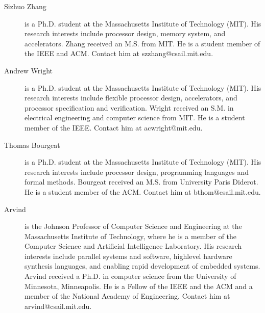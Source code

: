 \documentclass[conference]{IEEEtran}
\begin{document}
\begin{description}
    \item[Sizhuo Zhang] is a Ph.D. student at the Massachusetts Institute of Technology (MIT).
    His research interests include processor design, memory system, and accelerators.
    Zhang received an M.S. from MIT.
    He is a student member of the IEEE and ACM.
    Contact him at szzhang@csail.mit.edu.
    
    \item[Andrew Wright] is a Ph.D. student at the Massachusetts Institute of Technology (MIT).
    His research interests include flexible processor design, accelerators, and processor specification and verification.
    Wright received an S.M. in electrical engineering and computer science from MIT.
    He is a student member of the IEEE.
    Contact him at acwright@mit.edu.
    
    \item[Thomas Bourgeat] is a Ph.D. student at the Massachusetts Institute of Technology (MIT).
    His research interests include processor design, programming languages and formal methods.
    Bourgeat received an M.S. from University Paris Diderot.
    He is a student member of the ACM.
    Contact him at bthom@csail.mit.edu.
    
    \item[Arvind] is the Johnson Professor of Computer Science and Engineering at the Massachusetts Institute of Technology, where he is a member of the Computer Science and Artificial Intelligence Laboratory.
    His research interests include parallel systems and software, highlevel hardware synthesis languages, and enabling rapid development of embedded systems.
    Arvind received a Ph.D. in computer science from the University of Minnesota, Minneapolis.
    He is a Fellow of the IEEE and the ACM and a member of the National Academy of Engineering.
    Contact him at arvind@csail.mit.edu.
\end{description}
\end{document}
